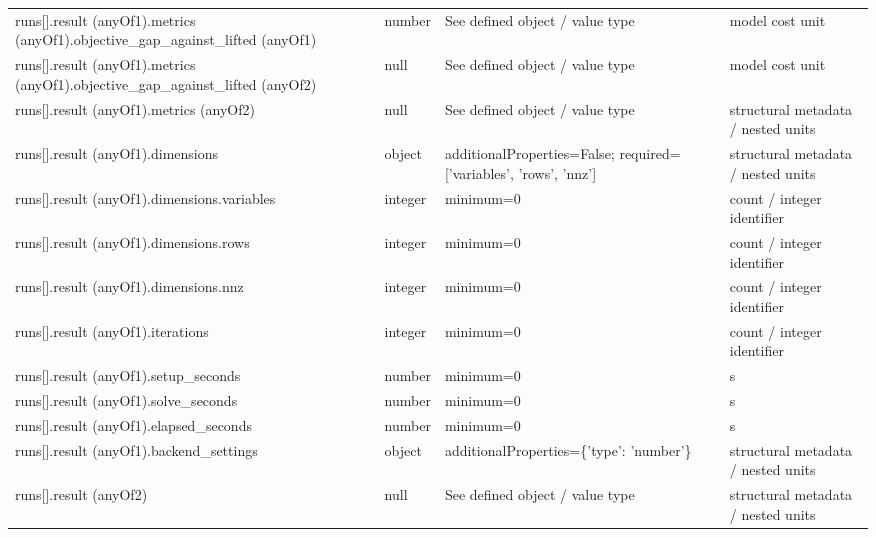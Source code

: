 \begin{longtable}{@{}>{\raggedright\arraybackslash}p{}>{\raggedright\arraybackslash}p{}>{\raggedright\arraybackslash}p{}>{\raggedright\arraybackslash}p{}@{}}
runs[].\allowbreak{}result (anyOf1).\allowbreak{}metrics (anyOf1).\allowbreak{}objective\_\allowbreak{}gap\_\allowbreak{}against\_\allowbreak{}lifted (anyOf1) & number & See defined object /\allowbreak{} value type & model cost unit\\
runs[].\allowbreak{}result (anyOf1).\allowbreak{}metrics (anyOf1).\allowbreak{}objective\_\allowbreak{}gap\_\allowbreak{}against\_\allowbreak{}lifted (anyOf2) & null & See defined object /\allowbreak{} value type & model cost unit\\
runs[].\allowbreak{}result (anyOf1).\allowbreak{}metrics (anyOf2) & null & See defined object /\allowbreak{} value type & structural metadata /\allowbreak{} nested units\\
runs[].\allowbreak{}result (anyOf1).\allowbreak{}dimensions & object & additionalProperties=\allowbreak{}False; required=\allowbreak{}['variables', 'rows', 'nnz'] & structural metadata /\allowbreak{} nested units\\
runs[].\allowbreak{}result (anyOf1).\allowbreak{}dimensions.\allowbreak{}variables & integer & minimum=\allowbreak{}0 & count /\allowbreak{} integer identifier\\
runs[].\allowbreak{}result (anyOf1).\allowbreak{}dimensions.\allowbreak{}rows & integer & minimum=\allowbreak{}0 & count /\allowbreak{} integer identifier\\
runs[].\allowbreak{}result (anyOf1).\allowbreak{}dimensions.\allowbreak{}nnz & integer & minimum=\allowbreak{}0 & count /\allowbreak{} integer identifier\\
runs[].\allowbreak{}result (anyOf1).\allowbreak{}iterations & integer & minimum=\allowbreak{}0 & count /\allowbreak{} integer identifier\\
runs[].\allowbreak{}result (anyOf1).\allowbreak{}setup\_\allowbreak{}seconds & number & minimum=\allowbreak{}0 & s\\
runs[].\allowbreak{}result (anyOf1).\allowbreak{}solve\_\allowbreak{}seconds & number & minimum=\allowbreak{}0 & s\\
runs[].\allowbreak{}result (anyOf1).\allowbreak{}elapsed\_\allowbreak{}seconds & number & minimum=\allowbreak{}0 & s\\
runs[].\allowbreak{}result (anyOf1).\allowbreak{}backend\_\allowbreak{}settings & object & additionalProperties=\allowbreak{}\{'type': 'number'\} & structural metadata /\allowbreak{} nested units\\
runs[].\allowbreak{}result (anyOf2) & null & See defined object /\allowbreak{} value type & structural metadata /\allowbreak{} nested units\\

\end{longtable}
